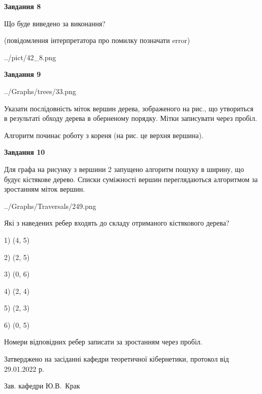 \documentclass[12pt, ukrainian]{article}
\begin{document}
{\begin {large}
{\begin {center}\textbf{Завдання 8}\end {center}}\par
Що буде виведено за виконання?\par
 (повідомлення інтерпретатора про помилку позначати error)\par
\begin{center}
	{../pict/42_8.png}
\end{center}
\newpage

{\begin {center}\textbf{Завдання 9}\end {center}}\par

\begin{center}
	{../Graphs/trees/33.png}
\end{center}
Указати послідовність міток вершин дерева, зображеного на рис., що утвориться в результаті обходу дерева в оберненому порядку. Мітки записувати через пробіл.\par Алгоритм починає роботу з кореня (на рис. це верхня вершина).\par
\newpage

{\begin {center}\textbf{Завдання 10}\end {center}}\par
Для графа на рисунку з вершини 2 запущено алгоритм пошуку в ширину, що будує кістякове дерево. Списки суміжності вершин переглядаються алгоритмом за зростанням міток вершин.\par
\begin{center}
	{../Graphs/Traversals/249.png}
\end{center}
\par Які з наведених ребер входять до складу отриманого кістякового дерева?\par
1) (4, 5)\par
2) (2, 5)\par
3) (0, 6)\par
4) (2, 4)\par
5) (2, 3)\par
6) (0, 5)\par
{\vskip 15pt} Номери відповідних ребер записати за зростанням через пробіл.\par
\newpage


\end {large}
}
{\smallskip \begin {small} Затверджено на засіданні кафедри теоретичної кібернетики, протокол  від   29.01.2022 р.\par\smallskip\smallskip
{\parbox {6.5 cm}{Зав. кафедри \dotfill Ю.В.~Крак}} \end{small}}
\end{document}
